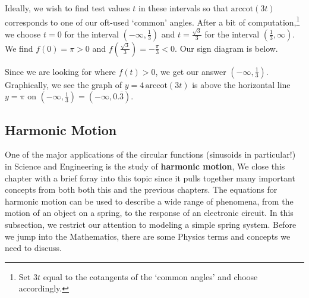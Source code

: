 \documentclass{ximera}
\begin{document}
\begin{example}
\begin{explanation}
\begin{enumerate}
 Ideally, we wish to find test values $t$ in these intervals so that $\text{arccot}(3t)$ corresponds to one of our oft-used `common' angles.  After a bit of computation,\footnote{Set $3t$ equal to the cotangents of the `common angles' and choose accordingly.} we choose $t=0$ for the interval  $\left(-\infty, \frac{1}{3}\right)$ and $t = \frac{\sqrt{3}}{3}$ for the interval $\left(\frac{1}{3}, \infty \right)$.  We find $f(0) = \pi > 0$ and $f\left(\frac{\sqrt{3}}{3}\right) = -\frac{\pi}{3} < 0$. Our sign diagram is below. 

 \begin{image}
% 
\end{image}
 
 Since we are looking for where $f(t) > 0$, we get our answer $\left(-\infty, \frac{1}{3}\right)$.   Graphically, we see  the graph of $y = 4 \, \text{arccot}(3t)$  is above the horizontal line $y = \pi$ on $\left(-\infty, \frac{1}{3}\right)= \left(-\infty, 0.\overline{3} \right)$.


\begin{center}
\end{center}

\end{enumerate}
\end{explanation}
\end{example}


\subsection{Harmonic Motion}
\label{harmomicmotion}

One of the major applications of the circular functions (sinusoids in particular!)  in Science and Engineering is the study of  \textbf{harmonic motion},  We close this chapter with a brief foray into this topic since it pulls together many important concepts from both both this and the previous chapters.  The equations for harmonic motion can be used to describe a wide range of phenomena, from the motion of an object on a spring, to the response of an electronic circuit.  In this subsection, we restrict our attention to modeling a simple spring system.  Before we jump into the Mathematics, there are some Physics terms and concepts we need to discuss.  
\end{document}
